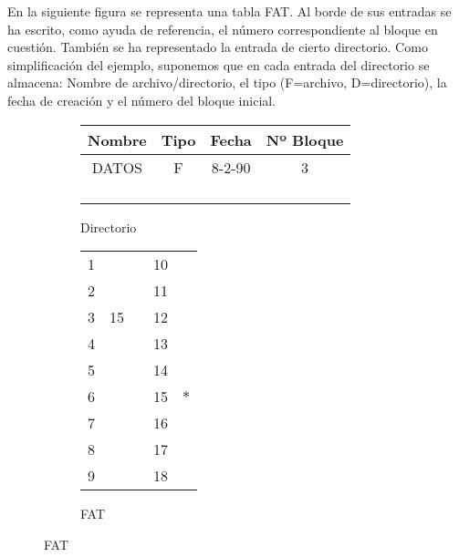 \begin{ejercicio} \label{ej:Rel4_Ej3}
En la siguiente figura se representa una tabla FAT. Al borde de sus entradas se ha escrito, como ayuda de referencia, el número correspondiente al bloque en cuestión. También se ha representado la entrada de cierto directorio. Como simplificación del ejemplo, suponemos que en cada entrada del directorio se almacena: Nombre de archivo/directorio, el tipo (F=archivo, D=directorio), la fecha de creación y el número del bloque inicial.

    \begin{figure}[H]
        \centering
        \begin{subfigure}[c]{0.5\textwidth}
            \centering
            \begin{tabular}{|c|c|c|c|}
                Nombre & Tipo & Fecha  & Nº Bloque \\ \hline \hline
                DATOS  & F    & 8-2-90 & 3         \\ \hline
                       &      &        &           \\ \hline
                       &      &        &           \\ \hline
                       &      &        &           \\ \hline
                       &      &        &           \\ \hline
            \end{tabular}
            \caption{Directorio}
        \end{subfigure}\hfill
        \begin{subfigure}[c]{0.5\textwidth}
            \centering
            \begin{tabular}{c|c|cc|c|}
                \cline{2-2} \cline{5-5}
                1 &  &\hspace{1cm}& 10 &  \\ \cline{2-2} \cline{5-5} 
                2 &  && 11 &  \\ \cline{2-2} \cline{5-5} 
                3 & 15 && 12 &  \\ \cline{2-2} \cline{5-5} 
                4 &  && 13 &  \\ \cline{2-2} \cline{5-5} 
                5 &  && 14 &  \\ \cline{2-2} \cline{5-5} 
                6 &  && 15 & $\ast$ \\ \cline{2-2} \cline{5-5} 
                7 &  && 16 &  \\ \cline{2-2} \cline{5-5} 
                8 &  && 17 &  \\ \cline{2-2} \cline{5-5} 
                9 &  && 18 &  \\ \cline{2-2} \cline{5-5} 
            \end{tabular}
            \caption{FAT}
        \end{subfigure}
    \end{figure}
    

\end{ejercicio}
